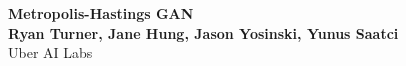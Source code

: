 \documentclass[a0,landscape]{a0poster}
\begin{document}


\begin{centering}{\fontsize{100}{120} \selectfont \color{NavyBlue} \textbf{Metropolis-Hastings GAN} \color{Black}}\\ %
\Huge \textbf{Ryan Turner, Jane Hung, Jason Yosinski, Yunus Saatci}\\ %
\huge Uber AI Labs \\ %
\end{centering}
%

%

\vspace{1cm} %

\end{document}

